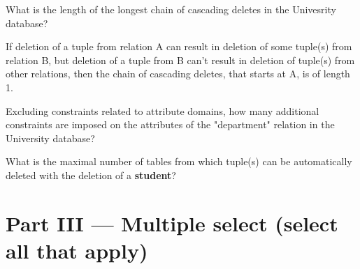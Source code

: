 \documentclass[12pt, addpoints, answers]{exam}
\begin{document}
\begin{questions}
\begin{minipage}{\linewidth}
\question[3]
What is the length of the longest chain of cascading deletes in the Univesrity database?\par\vspace{0.5em}
If deletion of a tuple from relation A can result in deletion of some tuple(s) from relation B, 
but deletion of a tuple from B can't result in deletion of tuple(s) from other relations, then the chain of cascading deletes, 
that starts at A, is of length 1.\par\vspace{0.5em}
\begin{checkboxes}
\end{checkboxes}
\end{minipage}\vspace{1em}

\begin{minipage}{\linewidth}
\question[3]
Excluding constraints related to attribute domains, how many additional constraints are imposed on the attributes of 
the "department" relation in the University database?\par\vspace{0.5em}
\begin{checkboxes}
\end{checkboxes}
\end{minipage}\vspace{1em}

\begin{minipage}{\linewidth}
\question[3]
What is the maximal number of tables from which tuple(s) can be automatically deleted with the deletion of a \textbf{student}?\par\vspace{0.5em}
\begin{checkboxes}
\end{checkboxes}
\end{minipage}\vspace{1em}

\section*{Part III — Multiple select (select all that apply)}


\end{questions}
\end{document}
